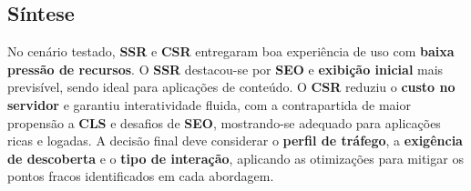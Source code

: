 \subsection{Síntese}
No cenário testado, \textbf{SSR} e \textbf{CSR} entregaram boa experiência de uso com \textbf{baixa pressão de recursos}. O \textbf{SSR} destacou-se por \textbf{SEO} e \textbf{exibição inicial} mais previsível, sendo ideal para aplicações de conteúdo. O \textbf{CSR} reduziu o \textbf{custo no servidor} e garantiu interatividade fluida, com a contrapartida de maior propensão a \textbf{CLS} e desafios de \textbf{SEO}, mostrando-se adequado para aplicações ricas e logadas. A decisão final deve considerar o \textbf{perfil de tráfego}, a \textbf{exigência de descoberta} e o \textbf{tipo de interação}, aplicando as otimizações para mitigar os pontos fracos identificados em cada abordagem.
